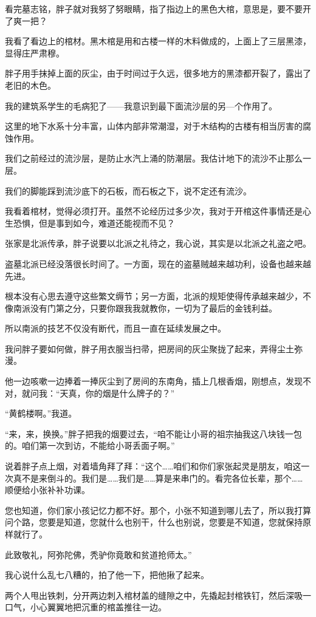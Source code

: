 看完墓志铭，胖子就对我努了努眼睛，指了指边上的黑色大棺，意思是，要不要开了爽一把？

我看了看边上的棺材。黑木棺是用和古楼一样的木料做成的，上面上了三层黑漆，显得庄严肃穆。

胖子用手抹掉上面的灰尘，由于时间过于久远，很多地方的黑漆都开裂了，露出了老旧的木色。

我的建筑系学生的毛病犯了——我意识到最下面流沙层的另—个作用了。

这里的地下水系十分丰富，山体内部非常潮湿，对于木结构的古楼有相当厉害的腐蚀作用。

我们之前经过的流沙层，是防止水汽上涌的防潮层。我估计地下的流沙不止那么一层。

我们的脚能踩到流沙底下的石板，而石板之下，说不定还有流沙。

我看着棺材，觉得必须打开。虽然不论经历过多少次，我对于开棺这件事情还是心生恐惧，但是事到如今，难道还能视而不见？

张家是北派传承，胖子说要以北派之礼待之，我心说，其实是以北派之礼盗之吧。

盗墓北派已经没落很长时间了。一方面，现在的盗墓贼越来越功利，设备也越来越先进。

根本没有心思去遵守这些繁文缛节；另一方面，北派的规矩使得传承越来越少，不像南派没有门第之分，只要你跟我我就教你，一切为了最后的金钱利益。

所以南派的技艺不仅没有断代，而且一直在延续发展之中。

我问胖子要如何做，胖子用衣服当扫帚，把房间的灰尘聚拢了起来，弄得尘土弥漫。

他一边咳嗽一边捧着一捧灰尘到了房间的东南角，插上几根香烟，刚想点，发现不对，就问我：“天真，你的烟是什么牌子的？”

“黄鹤楼啊。”我道。

“来，来，换换。”胖子把我的烟要过去，“咱不能让小哥的祖宗抽我这八块钱一包的。咱们第一次到访，不能给小哥丢面子啊。”

说着胖子点上烟，对着墙角拜了拜：“这个……咱们和你们家张起灵是朋友，咱这一次真不是来倒斗的。我们是……我们是……算是来串门的。看完各位长辈，那个……顺便给小张补补功课。

您也知道，你们家小孩记忆力都不好。那个，小张不知道到哪儿去了，所以我打算问个路，您要是知道，您就什么也别干，什么也别说，您要是不知道，您就保持原样就行了。

此致敬礼，阿弥陀佛，秃驴你竟敢和贫道抢师太。”

我心说什么乱七八糟的，拍了他一下，把他揪了起来。

两个人甩出铁刺，分开两边刺入棺材盖的缝隙之中，先撬起封棺铁钉，然后深吸一口气，小心翼翼地把沉重的棺盖推往一边。

